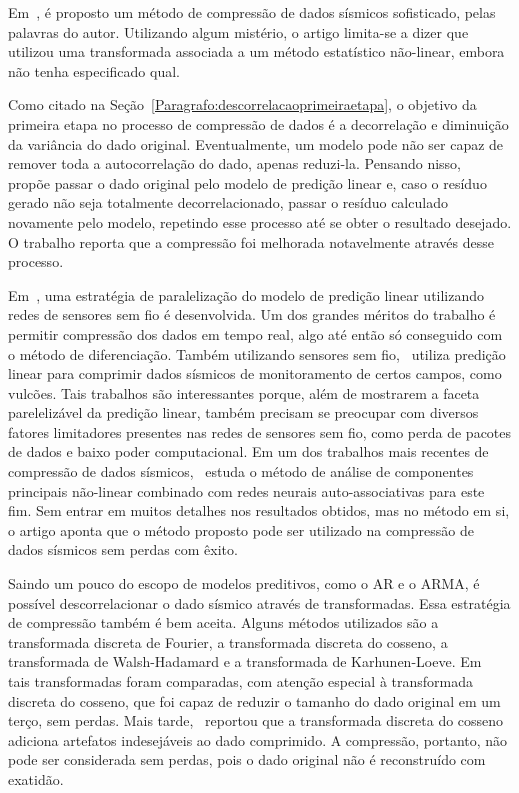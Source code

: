 Em~\citep{Artigo:naolinearestat}, é proposto um método de compressão de dados
sísmicos sofisticado, pelas palavras do autor. Utilizando algum mistério, o
artigo limita-se a dizer que utilizou uma transformada associada a um método
estatístico não-linear, embora não tenha especificado qual.

Como citado na Seção~\ref{Paragrafo:descorrelacaoprimeiraetapa}, o objetivo
da primeira etapa no processo de compressão de dados é a decorrelação e
diminuição da variância do dado original. Eventualmente, um modelo pode não ser
capaz de remover toda a autocorrelação do dado, apenas reduzi-la. Pensando
nisso,~\citep{Artigo:multiplepasses} propõe passar o dado original pelo modelo
de predição linear e, caso o resíduo gerado não seja totalmente decorrelacionado,
passar o resíduo calculado novamente pelo modelo, repetindo esse processo até se
obter o resultado desejado. O trabalho reporta que a compressão foi melhorada
notavelmente através desse processo.

Em~\citep{Artigo:lpparalelizado}, uma estratégia de paralelização do modelo de
predição linear utilizando redes de sensores sem fio é desenvolvida. Um dos
grandes méritos do trabalho é permitir compressão dos dados em tempo real, algo
até então só conseguido com o método de diferenciação. Também utilizando
sensores sem fio,~\citep{Artigo:lpsemfio} utiliza predição linear para comprimir
dados sísmicos de monitoramento de certos campos, como vulcões. Tais trabalhos
são interessantes porque, além de mostrarem a faceta parelelizável da predição
linear, também precisam se preocupar com diversos fatores limitadores presentes
nas redes de sensores sem fio, como perda de pacotes de dados e baixo poder
computacional. Em um dos trabalhos mais recentes de compressão de dados
sísmicos,~\citep{Artigo:pcalinenaolin} estuda o método de análise de
componentes principais não-linear combinado com redes neurais
auto-associativas para este fim. Sem entrar em muitos detalhes nos resultados
obtidos, mas no método em si, o artigo aponta que o método proposto pode ser
utilizado na compressão de dados sísmicos sem perdas com êxito.

Saindo um pouco do escopo de modelos preditivos, como o AR e o ARMA, é possível
descorrelacionar o dado sísmico através de transformadas. Essa estratégia de
compressão também é bem aceita. Alguns métodos utilizados são 
a transformada discreta de Fourier, a transformada discreta do cosseno, a
transformada de Walsh-Hadamard e a transformada de Karhunen-Loeve.
Em~\citep{Artigo:comparartransformadas} tais transformadas foram comparadas, com
atenção especial à transformada discreta do cosseno, que foi capaz de reduzir o
tamanho do dado original em um terço, sem perdas. Mais
tarde,~\citep{Artigo:dctruim} reportou que a transformada discreta do cosseno
adiciona artefatos indesejáveis ao dado comprimido. A compressão, portanto, não
pode ser considerada sem perdas, pois o dado original não é reconstruído com
exatidão.

